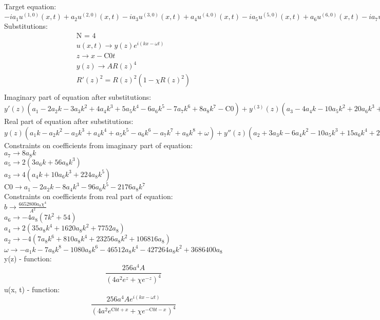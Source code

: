 \documentclass[12pt,a4paper,draft]{article}
\begin{document}
Target equation:
\\$
-i a_{1} u^{(1,0)}(x,t)+a_{2} u^{(2,0)}(x,t)-i a_{3} u^{(3,0)}(x,t)+a_{4} u^{(4,0)}(x,t)-i a_{5} u^{(5,0)}(x,t)+a_{6} u^{(6,0)}(x,t)-i a_{7} u^{(7,0)}(x,t)+a_{8} u^{(8,0)}(x,t)-b u(x,t) \left| u(x,t)\right| ^2+i u^{(0,1)}(x,t)=0
$\\
Substitutions:
$$
\begin{array}{c}
 \text{N = 4} \\
 u(x,t)\to y(z) e^{i (k x-\omega  t)} \\
 z\to x-\text{C0} t \\
 y(z)\to A R(z)^4 \\
 R'(z)^2=R(z)^2 \left(1-\chi  R(z)^2\right) \\
\end{array}
$$
Imaginary part of equation after substitutions:
\\$
y'(z) \left(a_{1}-2 a_{2} k-3 a_{3} k^2+4 a_{4} k^3+5 a_{5} k^4-6 a_{6} k^5-7 a_{7} k^6+8 a_{8} k^7-\text{C0}\right)+y^{(3)}(z) \left(a_{3}-4 a_{4} k-10 a_{5} k^2+20 a_{6} k^3+35 a_{7} k^4-56 a_{8} k^5\right)+a_{5} y^{(5)}(z)-6 a_{6} k y^{(5)}(z)-21 a_{7} k^2 y^{(5)}(z)+a_{7} y^{(7)}(z)+56 a_{8} k^3 y^{(5)}(z)-8 a_{8} k y^{(7)}(z)=0
$\\
Real part of equation after substitutions:
\\$
y(z) \left(a_{1} k-a_{2} k^2-a_{3} k^3+a_{4} k^4+a_{5} k^5-a_{6} k^6-a_{7} k^7+a_{8} k^8+\omega \right)+y''(z) \left(a_{2}+3 a_{3} k-6 a_{4} k^2-10 a_{5} k^3+15 a_{6} k^4+21 a_{7} k^5-28 a_{8} k^6\right)+a_{4} y^{(4)}(z)+5 a_{5} k y^{(4)}(z)-15 a_{6} k^2 y^{(4)}(z)+a_{6} y^{(6)}(z)-35 a_{7} k^3 y^{(4)}(z)+7 a_{7} k y^{(6)}(z)+70 a_{8} k^4 y^{(4)}(z)-28 a_{8} k^2 y^{(6)}(z)+a_{8} y^{(8)}(z)-b y(z)^3=0
$\\
Constraints on coefficients from imaginary part of equation:
\\$a_{7}\to 8 a_{8} k$\\
$a_{5}\to 2 \left(3 a_{6} k+56 a_{8} k^3\right)$\\
$a_{3}\to 4 \left(a_{4} k+10 a_{6} k^3+224 a_{8} k^5\right)$\\
$\text{C0}\to a_{1}-2 a_{2} k-8 a_{4} k^3-96 a_{6} k^5-2176 a_{8} k^7$\\
Constraints on coefficients from real part of equation:
\\$b\to \frac{6652800 a_{8} \chi ^4}{A^2}$\\
$a_{6}\to -4 a_{8} \left(7 k^2+54\right)$\\
$a_{4}\to 2 \left(35 a_{8} k^4+1620 a_{8} k^2+7752 a_{8}\right)$\\
$a_{2}\to -4 \left(7 a_{8} k^6+810 a_{8} k^4+23256 a_{8} k^2+106816 a_{8}\right)$\\
$\omega \to -a_{1} k-7 a_{8} k^8-1080 a_{8} k^6-46512 a_{8} k^4-427264 a_{8} k^2+3686400 a_{8}$\\


y(z) - function:
$$
\frac{256 a^4 A}{\left(4 a^2 e^z+\chi  e^{-z}\right)^4}
$$
u(x, t) - function:
$$
\frac{256 a^4 A e^{i (k x-\omega  t)}}{\left(4 a^2 e^{\text{C0} t+x}+\chi  e^{-\text{C0} t-x}\right)^4}
$$
\end{document}
